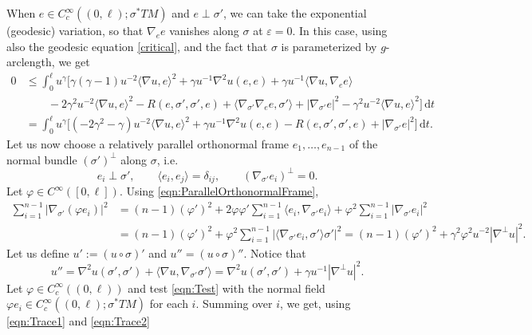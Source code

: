 \documentclass[12pt,a4paper,reqno]{amsart}
\theoremstyle{definition}
\renewcommand{\leq}{\leqslant}
\newcommand{\D}{\nabla}
\newcommand{\metric}[2]{\langle#1,#2\rangle}
\begin{document}
When $e\in C_c^\infty((0,\ell);\sigma^*TM)$ and $e\perp\sigma'$, we can take the exponential (geodesic) variation, so that $\D_ee$ vanishes along $\sigma$ at $\varepsilon=0$. In this case, using also the geodesic equation \eqref{critical}, and the fact that $\sigma$ is parameterized by $g$-arclength, we get
\begin{equation}\label{eqn:Test}
\begin{aligned}
    0 &\leq \int_0^\ell u^\gamma\Big[\gamma(\gamma-1)u^{-2}\metric{\D u}{e}^2+\gamma u^{-1}\D^2 u(e,e)+\gamma u^{-1}\metric{\D u}{\D_ee} \\
    &\qquad -2\gamma^2 u^{-2}\metric{\D u}{e}^2-R(e,\sigma',\sigma',e)+\metric{\D_{\sigma'}\D_ee}{\sigma'}+|\nabla_{\sigma'}e|^2-\gamma^2u^{-2}\metric{\D u}{e}^2\Big]\,\mathrm{d}t \\
    &= \int_0^\ell u^\gamma\Big[(-2\gamma^2-\gamma)u^{-2}\metric{\D u}{e}^2+\gamma u^{-1}\D^2 u(e,e)-R(e,\sigma',\sigma',e)+|\nabla_{\sigma'}e|^2\Big]\,\mathrm{d}t.
\end{aligned}
\end{equation}
Let us now choose a relatively parallel orthonormal frame \(e_1,\ldots,e_{n-1}\) of the normal
bundle \((\sigma')^\perp\) along \(\sigma\), i.e.
\begin{equation}\label{eqn:ParallelOrthonormalFrame}
e_i\perp \sigma',\qquad \langle e_i,e_j\rangle=\delta_{ij},\qquad
(\nabla_{\sigma'}e_i)^\perp=0.
\end{equation}
Let $\varphi\in C^\infty([0,\ell])$. Using \eqref{eqn:ParallelOrthonormalFrame},
\begin{equation}\label{eqn:Trace1}
\begin{aligned}
\sum_{i=1}^{n-1} |\nabla_{\sigma'}(\varphi e_i)|^2 &= (n-1)(\varphi')^2+2\varphi\varphi'\sum_{i=1}^{n-1}\langle e_i,\nabla_{\sigma'}e_i\rangle + \varphi^2\sum_{i=1}^{n-1}|\nabla_{\sigma'}e_i|^2 \\
&=(n-1)(\varphi')^2+\varphi^2 \sum_{i=1}^{n-1}|\langle \nabla_{\sigma'}e_i,\sigma'\rangle \sigma'|^2 = (n-1)(\varphi')^2+ \gamma^2\varphi^2 u^{-2}|\nabla^\perp u|^2.
\end{aligned}
\end{equation}
Let us define $u':=(u\circ\sigma)'$ and $u''=(u\circ\sigma)''$. Notice that 
\begin{equation}\label{eqn:Trace2}
u''=\nabla^2 u(\sigma',\sigma')+\langle \nabla u,\nabla_{\sigma'}\sigma'\rangle = \nabla^2 u(\sigma',\sigma')+\gamma u^{-1}|\nabla^\perp u|^2.
\end{equation}
Let $\varphi\in C^\infty_c((0,\ell))$ and test \eqref{eqn:Test} with the normal field $\varphi e_i\in C_c^\infty((0,\ell);\sigma^*TM)$ for each $i$. Summing over $i$, we get, using \eqref{eqn:Trace1} and \eqref{eqn:Trace2}
\end{document}
